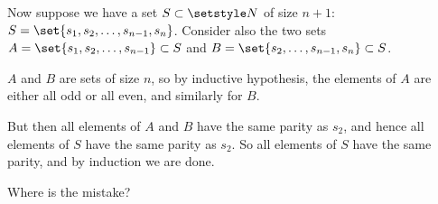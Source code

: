 \begin{enumerate}
\begin{tcolorbox}
   Now suppose we have a set \(S \subset \Naturals\) of size \(n + 1\):
   \(S = \set{s_1, s_2, \dotsc, s_{n - 1}, s_n}\). Consider also the two sets
   \(A = \set{s_1, s_2, \dotsc, s_{n - 1}} \subset S\) and
   \(B = \set{s_2, \dotsc, s_{n - 1}, s_n} \subset S\).

   \(A\) and \(B\) are sets of size \(n\), so by inductive hypothesis, the
   elements of \(A\) are either all odd or all even, and similarly for \(B\).

   But then all elements of \(A\) and \(B\) have the same parity as \(s_2\), and
   hence all elements of \(S\) have the same parity as \(s_2\). So all elements
   of \(S\) have the same parity, and by induction we are done.
  \end{tcolorbox}
  Where is the mistake?
\end{enumerate}
